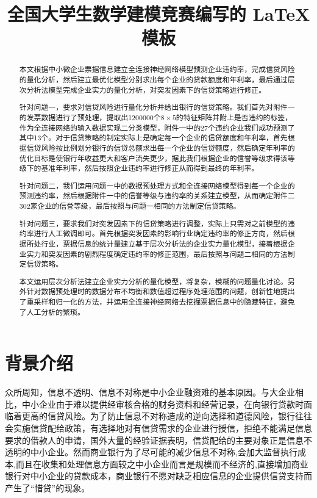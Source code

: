 \documentclass{cumcmthesis}
\title{全国大学生数学建模竞赛编写的 \LaTeX{} 模板}
\begin{document}
 \maketitle
 \begin{abstract}
    本文根据中小微企业票据信息建立全连接神经网络模型预测企业违约率，完成信贷风险的量化分析，然后建立最优化模型分别求出每个企业的贷款额度和年利率，最后通过层次分析法模型完成企业实力的量化分析，对突发因素下的信贷策略进行修正。
    
    针对问题一，要求对信贷风险进行量化分析并给出银行的信贷策略。我们首先对附件一的发票数据进行了预处理，提取出1200000个$8 \times 5$的特征矩阵并附上是否违约的标签，作为全连接网络的输入数据实现二分类模型，附件一中的27个违约企业我们成功预测了其中13个。对于信贷策略的制定实际上是确定每一个企业的信贷额度和年利率，首先根据信贷风险按比例划分银行的信贷总额求出每一个企业的信贷额度，然后确定年利率的优化目标是使银行年收益更大和客户流失更少，据此我们根据企业的信誉等级求得该等级下的基准年利率，然后按照企业违约率进行修正从而得到最终的年利率。
    
    针对问题二，我们运用问题一中的数据预处理方式和全连接网络模型得到每一个企业的预测违约率，然后根据附件一中的信誉等级与违约率的关系建立模型，从而确定附件二302家企业的信誉等级，最后按照与问题一相同的方法制定信贷策略。
    
    针对问题三，要求我们对突发因素下的信贷策略进行调整，实际上只需对之前模型的违约率进行人工微调即可。首先根据突发因素的影响行业确定违约率的修正方向，然后根据所处行业，票据信息的统计量建立基于层次分析法的企业实力量化模型，接着根据企业实力和突发因素的剧烈程度确定违约率的修正范围，最后按照与问题二相同的方法制定信贷策略。
    
    本文运用层次分析法建立企业实力分析的量化模型，将复杂，模糊的问题量化讨论。另外针对数据预处理时的数据分布不均衡和数值超过程序处理范围的问题，创新性地提出了重采样和归一化的方法，并运用全连接神经网络去挖掘票据信息中的隐藏特征，避免了人工分析的繁琐。
    

\end{abstract}



\section{背景介绍}

众所周知，信息不透明、信息不对称是中小企业融资难的基本原因。与大企业相比，中小企业由于难以提供经审核合格的财务资料和经营记录，在向银行贷款时面临着更高的信贷风险。为了防止信息不对称造成的逆向选择和道德风险，银行往往会实施信贷配给政策，有选择地对有信贷需求的企业进行授信，拒绝不能满足信息要求的借款人的申请，国外大量的经验证据表明，信贷配给的主要对象正是信息不透明的中小企业。然而商业银行为了尽可能的减少信息不对称,会加大监督执行成本,而且在收集和处理信息方面较之中小企业而言是规模而不经济的,直接增加商业银行对中小企业的贷款成本，商业银行不愿对缺乏相应信息的企业提供信贷支持而产生了“惜贷”的现象。
\end{document}
